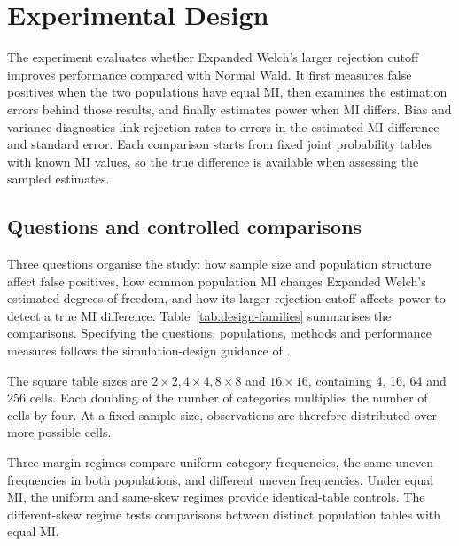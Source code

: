 \chapter{Experimental Design}
\label{chap:design}

The experiment evaluates whether Expanded Welch's larger rejection cutoff
improves performance compared with Normal Wald. It first measures false
positives when the two populations have equal MI, then examines the
estimation errors behind those results,
and finally estimates power when MI differs. Bias and variance diagnostics
link rejection rates to errors in the estimated MI difference and standard
error. Each comparison starts from fixed joint probability tables with
known MI values, so the
true difference is available when assessing the sampled estimates.

\section{Questions and controlled comparisons}

Three questions organise the study: how sample size and population structure
affect false positives, how common population MI changes Expanded Welch's
estimated degrees of freedom, and how its larger rejection cutoff affects
power to detect a true MI difference. Table~\ref{tab:design-families}
summarises the comparisons. Specifying the questions, populations,
methods and performance measures follows the simulation-design guidance of
\citet{morris2019}.

The square table sizes are \(2\times2,4\times4,8\times8\) and
\(16\times16\), containing 4, 16, 64 and 256 cells. Each doubling of
the number of categories multiplies the number of cells by four. At a
fixed sample size, observations are therefore distributed over more
possible cells.

Three margin regimes compare uniform category frequencies, the same
uneven frequencies in both populations, and different uneven frequencies.
Under equal MI, the uniform and same-skew regimes provide identical-table
controls. The different-skew regime tests comparisons between distinct
population tables with equal MI.

